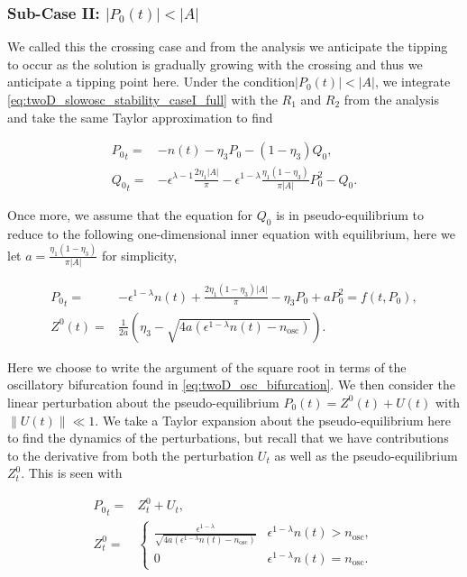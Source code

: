 \subsubsection{Sub-Case II: $|P_0(t)|<|A|$}

We called this the crossing case and from the analysis we anticipate the tipping to occur as the solution is gradually growing with the crossing and thus we anticipate a tipping point here. Under the condition$|P_0(t)|<|A|$, we integrate \eqref{eq:twoD_slowosc_stability_caseI_full} with the $R_1$ and $R_2$ from the analysis and take the same Taylor approximation to find 

\begin{equation}\label{eq:twoD_slowosc_stability_subcaseII,full}
\begin{aligned}
{P_0}_t =& -n(t)-\eta_3 P_0-(1-\eta_3)Q_0,\\
{Q_0}_t =&-\epsilon^{\lambda-1}\frac{2\eta_1|A|}{\pi}-\epsilon^{1-\lambda}\frac{\eta_1(1-\eta_3)}{\pi|A|}P_0^2-Q_0.
\end{aligned}
\end{equation}

Once more, we assume that the equation for $Q_0$ is in pseudo-equilibrium 
to reduce to the following one-dimensional inner equation with equilibrium, here we let $a=\frac{\eta_1(1-\eta_3)}{\pi|A|}$ for simplicity,

\begin{equation}\label{eq:twoD_slowosc_stability_subcaseII,reduced}
\begin{aligned}
{P_0}_t =& -\epsilon^{1-\lambda}n(t)+\frac{2\eta_1(1-\eta_3)|A|}{\pi}-\eta_3 P_0+aP_0^2=f(t,P_0),\\
Z^0(t) =& \frac{1}{2a}\left(\eta_3-\sqrt{4a(\epsilon^{1-\lambda}n(t)-n_{\text{osc}})}\right).
\end{aligned}
\end{equation}

Here we choose to write the argument of the square root in terms of the oscillatory bifurcation found in \eqref{eq:twoD_osc_bifurcation}. We then consider the linear perturbation about the pseudo-equilibrium $P_0(t)= Z^0(t)+U(t)$ with $\lVert U(t)\rVert \ll 1$. We take a Taylor expansion about the pseudo-equilibrium here to find the dynamics of the perturbations, but recall that we have contributions to the derivative from both the perturbation $U_t$ as well as the pseudo-equilibrium $Z^0_t$. This is seen with

\begin{equation}
\begin{aligned}
{P_0}_t =& Z^0_t+U_t,\\
Z^0_t=&\begin{cases}
\frac{\epsilon^{1-\lambda}}{\sqrt{4a(\epsilon^{1-\lambda}n(t)-n_{\text{osc}})}} & \epsilon^{1-\lambda}n(t)>n_{\text{osc}},\\
0 & \epsilon^{1-\lambda}n(t)=n_{\text{osc}}.
\end{cases}
\end{aligned}
\end{equation}

